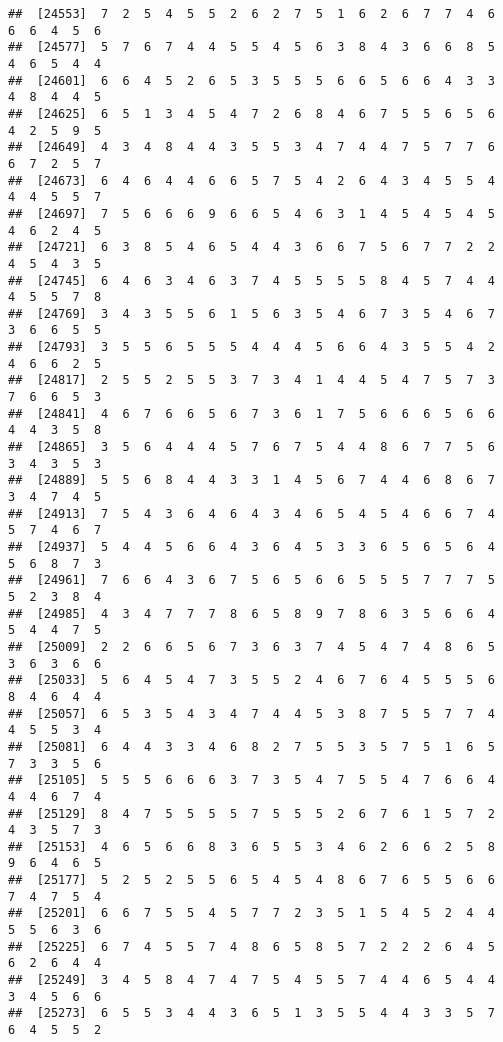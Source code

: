 \documentclass[
]{book}
\begin{document}
\begin{verbatim}
##  [24553]  7  2  5  4  5  5  2  6  2  7  5  1  6  2  6  7  7  4  6  6  6  4  5  6
##  [24577]  5  7  6  7  4  4  5  5  4  5  6  3  8  4  3  6  6  8  5  4  6  5  4  4
##  [24601]  6  6  4  5  2  6  5  3  5  5  5  6  6  5  6  6  4  3  3  4  8  4  4  5
##  [24625]  6  5  1  3  4  5  4  7  2  6  8  4  6  7  5  5  6  5  6  4  2  5  9  5
##  [24649]  4  3  4  8  4  4  3  5  5  3  4  7  4  4  7  5  7  7  6  6  7  2  5  7
##  [24673]  6  4  6  4  4  6  6  5  7  5  4  2  6  4  3  4  5  5  4  4  4  5  5  7
##  [24697]  7  5  6  6  6  9  6  6  5  4  6  3  1  4  5  4  5  4  5  4  6  2  4  5
##  [24721]  6  3  8  5  4  6  5  4  4  3  6  6  7  5  6  7  7  2  2  4  5  4  3  5
##  [24745]  6  4  6  3  4  6  3  7  4  5  5  5  5  8  4  5  7  4  4  4  5  5  7  8
##  [24769]  3  4  3  5  5  6  1  5  6  3  5  4  6  7  3  5  4  6  7  3  6  6  5  5
##  [24793]  3  5  5  6  5  5  5  4  4  4  5  6  6  4  3  5  5  4  2  4  6  6  2  5
##  [24817]  2  5  5  2  5  5  3  7  3  4  1  4  4  5  4  7  5  7  3  7  6  6  5  3
##  [24841]  4  6  7  6  6  5  6  7  3  6  1  7  5  6  6  6  5  6  6  4  4  3  5  8
##  [24865]  3  5  6  4  4  4  5  7  6  7  5  4  4  8  6  7  7  5  6  3  4  3  5  3
##  [24889]  5  5  6  8  4  4  3  3  1  4  5  6  7  4  4  6  8  6  7  3  4  7  4  5
##  [24913]  7  5  4  3  6  4  6  4  3  4  6  5  4  5  4  6  6  7  4  5  7  4  6  7
##  [24937]  5  4  4  5  6  6  4  3  6  4  5  3  3  6  5  6  5  6  4  5  6  8  7  3
##  [24961]  7  6  6  4  3  6  7  5  6  5  6  6  5  5  5  7  7  7  5  5  2  3  8  4
##  [24985]  4  3  4  7  7  7  8  6  5  8  9  7  8  6  3  5  6  6  4  5  4  4  7  5
##  [25009]  2  2  6  6  5  6  7  3  6  3  7  4  5  4  7  4  8  6  5  3  6  3  6  6
##  [25033]  5  6  4  5  4  7  3  5  5  2  4  6  7  6  4  5  5  5  6  8  4  6  4  4
##  [25057]  6  5  3  5  4  3  4  7  4  4  5  3  8  7  5  5  7  7  4  4  5  5  3  4
##  [25081]  6  4  4  3  3  4  6  8  2  7  5  5  3  5  7  5  1  6  5  7  3  3  5  6
##  [25105]  5  5  5  6  6  6  3  7  3  5  4  7  5  5  4  7  6  6  4  4  4  6  7  4
##  [25129]  8  4  7  5  5  5  5  7  5  5  5  2  6  7  6  1  5  7  2  4  3  5  7  3
##  [25153]  4  6  5  6  6  8  3  6  5  5  3  4  6  2  6  6  2  5  8  9  6  4  6  5
##  [25177]  5  2  5  2  5  5  6  5  4  5  4  8  6  7  6  5  5  6  6  7  4  7  5  4
##  [25201]  6  6  7  5  5  4  5  7  7  2  3  5  1  5  4  5  2  4  4  5  5  6  3  6
##  [25225]  6  7  4  5  5  7  4  8  6  5  8  5  7  2  2  2  6  4  5  6  2  6  4  4
##  [25249]  3  4  5  8  4  7  4  7  5  4  5  5  7  4  4  6  5  4  4  3  4  5  6  6
##  [25273]  6  5  5  3  4  4  3  6  5  1  3  5  5  4  4  3  3  5  7  6  4  5  5  2

\end{verbatim}
\end{document}
